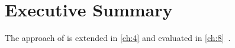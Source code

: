 \chapter*{Executive Summary}
\lipsum[67-69]

The approach of \citet{sum-1} is extended in \cref{ch:4} and evaluated in \cref{ch:8}~\citep{sum-2,sum-3,sum-4}.

